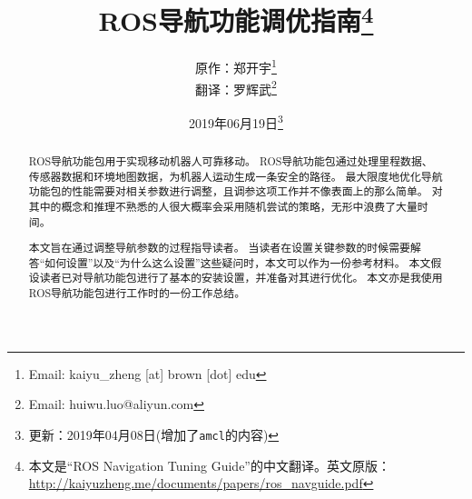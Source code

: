 \documentclass[lang=cn, zihao =-4]{elegantpaper}
\title{ROS导航功能调优指南\thanks{本文是``ROS Navigation Tuning Guide''的中文翻译。英文原版：\url{http://kaiyuzheng.me/documents/papers/ros_navguide.pdf}}}
\author{{\kaishu 原作}：郑开宇\thanks{Email: kaiyu\_zheng [at] brown [dot] edu}\\
{\kaishu 翻译}：罗辉武\thanks{Email: huiwu.luo@aliyun.com}}
\date{2019年06月19日\footnote{更新：2019年04月08日(增加了\texttt{amcl}的内容)}}
\begin{document}
{
	\maketitle
}

\begin{abstract}
\normalsize
\indent ROS导航功能包用于实现移动机器人可靠移动。
ROS导航功能包通过处理里程数据、传感器数据和环境地图数据，为机器人运动生成一条安全的路径。
最大限度地优化导航功能包的性能需要对相关参数进行调整，且调参这项工作并不像表面上的那么简单。
对其中的概念和推理不熟悉的人很大概率会采用随机尝试的策略，无形中浪费了大量时间。

本文旨在通过调整导航参数的过程指导读者。
当读者在设置关键参数的时候需要解答“如何设置”以及“为什么这么设置”这些疑问时，本文可以作为一份参考材料。
本文假设读者已对导航功能包进行了基本的安装设置，并准备对其进行优化。
本文亦是我使用ROS导航功能包进行工作时的一份工作总结。
\end{abstract}

{
	\hypersetup{linkcolor=blue}%
	\tableofcontents
}

\begin{refsection}
	
	\nocite{*}
	\printbibliography[heading=subbibliography,title=【参考文献】]
\end{refsection}
\end{document}
